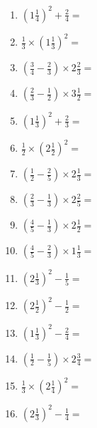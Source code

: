\documentclass[12pt]{article}
\begin{document}
\begin{enumerate}
\newpage
\item \large $ \left( 1 \frac{1}{4} \right)^2 + \frac{2}{4} = $ \vspace{1.6cm}
\item \large $ \frac{1}{3} \times \left( 1 \frac{1}{3} \right)^2 = $ \vspace{1.6cm}
\item \large $ \left( \frac{3}{4} - \frac{2}{3} \right) \times 2 \frac{2}{3} = $ \vspace{1.6cm}
\item \large $ \left( \frac{2}{3} - \frac{1}{2} \right) \times 3 \frac{1}{2} = $ \vspace{1.6cm}
\item \large $ \left( 1 \frac{1}{3} \right)^2 + \frac{2}{3} = $ \vspace{1.6cm}
\item \large $ \frac{1}{2} \times \left( 2 \frac{1}{2} \right)^2 = $ \vspace{1.6cm}
\item \large $ \left( \frac{1}{2} - \frac{2}{5} \right) \times 2 \frac{1}{3} = $ \vspace{1.6cm}
\item \large $ \left( \frac{2}{3} - \frac{1}{3} \right) \times 2 \frac{2}{5} = $ \vspace{1.6cm}
\item \large $ \left( \frac{4}{5} - \frac{1}{3} \right) \times 2 \frac{1}{2} = $ \vspace{1.6cm}
\item \large $ \left( \frac{4}{5} - \frac{2}{3} \right) \times 1 \frac{1}{3} = $ \vspace{1.6cm}
\newpage
\item \large $ \left( 2 \frac{1}{3} \right)^2 - \frac{1}{5} = $ \vspace{1.6cm}
\item \large $ \left( 2 \frac{1}{2} \right)^2 - \frac{1}{2} = $ \vspace{1.6cm}
\item \large $ \left( 1 \frac{1}{3} \right)^2 - \frac{2}{4} = $ \vspace{1.6cm}
\item \large $ \left( \frac{1}{2} - \frac{1}{5} \right) \times 2 \frac{3}{4} = $ \vspace{1.6cm}
\item \large $ \frac{1}{3} \times \left( 2 \frac{1}{4} \right)^2 = $ \vspace{1.6cm}
\item \large $ \left( 2 \frac{1}{3} \right)^2 - \frac{1}{4} = $ \vspace{1.6cm}

\end{enumerate}
\end{document}
